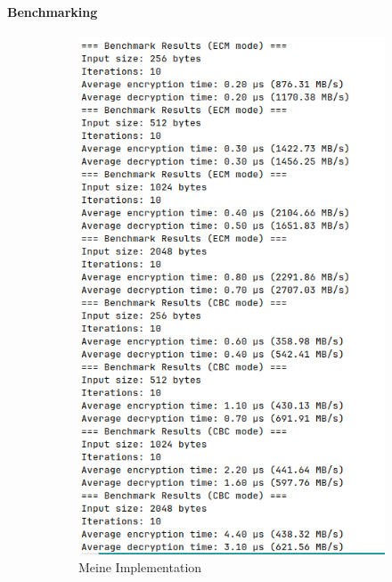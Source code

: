 \paragraph{Benchmarking}
\begin{figure}[h]
    \centering
    \begin{subfigure}[b]{0.49\textwidth}
        \centering
        \includegraphics[width=\textwidth]{img/bench/custombench}
        \caption{Meine Implementation}
        \label{fig:bench_my}
    \end{subfigure}
    \hfill
    \begin{subfigure}[b]{0.49\textwidth}

\end{subfigure}
\end{figure}

